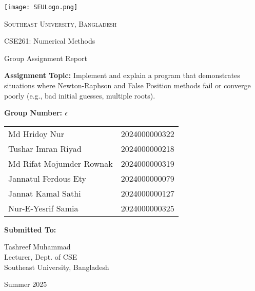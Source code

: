 \documentclass[12pt,a4paper]{article}
\begin{document}
\begin{titlepage}
    \centering
    \texttt{[image: SEULogo.png]}\par\vspace{1cm}
    {\scshape\LARGE Southeast University, Bangladesh \par}
    \vspace{1cm}
    {\Large CSE261: Numerical Methods \par}
    \vspace{0.5cm}
    {\Large Group Assignment Report \par}
    \vspace{1.5cm}
    {\large \textbf{Assignment Topic:} Implement and explain a program that demonstrates situations where Newton-Raphson and False Position methods fail or converge poorly (e.g., bad initial guesses, multiple roots). \par}
    \vfill
    \textbf{Group Number: $\epsilon$ } \par
    \begin{tabular}{ll}
       Md Hridoy Nur & 2024000000322 \\
       Tushar Imran Riyad  & 2024000000218 \\
       Md Rifat Mojumder Rownak & 2024000000319 \\
       Jannatul Ferdous Ety & 2024000000079 \\
       Jannat Kamal Sathi & 2024000000127 \\
       Nur-E-Yesrif Samia & 2024000000325 \\
    \end{tabular}
    \vfill

    \textbf{Submitted To:}  \par
    [TMD] Tashreef Muhammad  \\
    Lecturer, Dept. of CSE  \\
    Southeast University, Bangladesh \par
    \vfill
    Summer 2025
\end{titlepage}
\end{document}
